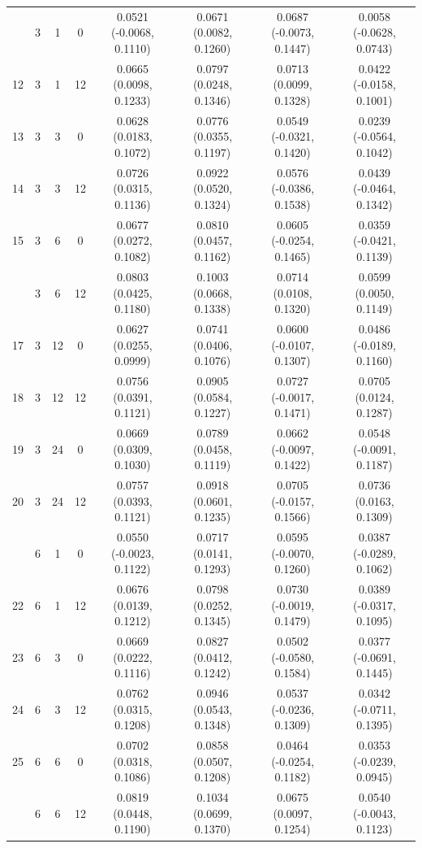 \begin{table}[!h]
{\begin{tabular}[t]{cccccccc}
\addlinespace
11 & 3 & 1 & 0 & 0.0521 (-0.0068, 0.1110) & 0.0671 (0.0082, 0.1260) & 0.0687 (-0.0073, 0.1447) & 0.0058 (-0.0628, 0.0743)\\
12 & 3 & 1 & 12 & 0.0665 (0.0098, 0.1233) & 0.0797 (0.0248, 0.1346) & 0.0713 (0.0099, 0.1328) & 0.0422 (-0.0158, 0.1001)\\
13 & 3 & 3 & 0 & 0.0628 (0.0183, 0.1072) & 0.0776 (0.0355, 0.1197) & 0.0549 (-0.0321, 0.1420) & 0.0239 (-0.0564, 0.1042)\\
14 & 3 & 3 & 12 & 0.0726 (0.0315, 0.1136) & 0.0922 (0.0520, 0.1324) & 0.0576 (-0.0386, 0.1538) & 0.0439 (-0.0464, 0.1342)\\
15 & 3 & 6 & 0 & 0.0677 (0.0272, 0.1082) & 0.0810 (0.0457, 0.1162) & 0.0605 (-0.0254, 0.1465) & 0.0359 (-0.0421, 0.1139)\\
\addlinespace
16 & 3 & 6 & 12 & 0.0803 (0.0425, 0.1180) & 0.1003 (0.0668, 0.1338) & 0.0714 (0.0108, 0.1320) & 0.0599 (0.0050, 0.1149)\\
17 & 3 & 12 & 0 & 0.0627 (0.0255, 0.0999) & 0.0741 (0.0406, 0.1076) & 0.0600 (-0.0107, 0.1307) & 0.0486 (-0.0189, 0.1160)\\
18 & 3 & 12 & 12 & 0.0756 (0.0391, 0.1121) & 0.0905 (0.0584, 0.1227) & 0.0727 (-0.0017, 0.1471) & 0.0705 (0.0124, 0.1287)\\
19 & 3 & 24 & 0 & 0.0669 (0.0309, 0.1030) & 0.0789 (0.0458, 0.1119) & 0.0662 (-0.0097, 0.1422) & 0.0548 (-0.0091, 0.1187)\\
20 & 3 & 24 & 12 & 0.0757 (0.0393, 0.1121) & 0.0918 (0.0601, 0.1235) & 0.0705 (-0.0157, 0.1566) & 0.0736 (0.0163, 0.1309)\\
\addlinespace
21 & 6 & 1 & 0 & 0.0550 (-0.0023, 0.1122) & 0.0717 (0.0141, 0.1293) & 0.0595 (-0.0070, 0.1260) & 0.0387 (-0.0289, 0.1062)\\
22 & 6 & 1 & 12 & 0.0676 (0.0139, 0.1212) & 0.0798 (0.0252, 0.1345) & 0.0730 (-0.0019, 0.1479) & 0.0389 (-0.0317, 0.1095)\\
23 & 6 & 3 & 0 & 0.0669 (0.0222, 0.1116) & 0.0827 (0.0412, 0.1242) & 0.0502 (-0.0580, 0.1584) & 0.0377 (-0.0691, 0.1445)\\
24 & 6 & 3 & 12 & 0.0762 (0.0315, 0.1208) & 0.0946 (0.0543, 0.1348) & 0.0537 (-0.0236, 0.1309) & 0.0342 (-0.0711, 0.1395)\\
25 & 6 & 6 & 0 & 0.0702 (0.0318, 0.1086) & 0.0858 (0.0507, 0.1208) & 0.0464 (-0.0254, 0.1182) & 0.0353 (-0.0239, 0.0945)\\
\addlinespace
26 & 6 & 6 & 12 & 0.0819 (0.0448, 0.1190) & 0.1034 (0.0699, 0.1370) & 0.0675 (0.0097, 0.1254) & 0.0540 (-0.0043, 0.1123)\\

\end{tabular}}
\end{table}
